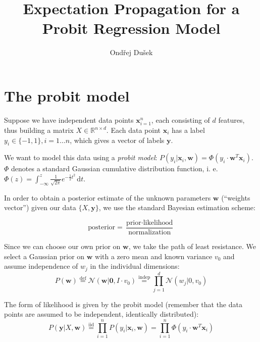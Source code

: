 \documentclass[10pt,a4paper,notitlepage]{article}
\title{Expectation Propagation for a Probit Regression Model}
\author{Ondřej Dušek}
\begin{document}

\def\ve#1{\mathbf{#1}}
\def\R{\mathbb{R}}
\def\E{\mathbb{E}}
\def\d{\,\mathrm{d}}
\def\N{\mathcal{N}}
\def\eqrel#1{\stackrel{\mathrm{#1}}{=}}
\def\cavity#1#2{#1^{\setminus #2}}
\def\new{\mathrm{new}}


\maketitle


\renewcommand{\baselinestretch}{1.2}
\setlength{\parskip}{8pt plus 1pt minus 2pt}


\section{The probit model}

Suppose we have independent data points ${\ve{x}}_{i=1}^n$, each consisting of $d$ features, thus building a matrix $X\in \R^{n\times d}$. Each data point $\ve{x}_i$ has a label $y_i \in \{-1,1\}, i=1\dots n$, which gives a vector of labels $\ve{y}$.

We want to model this data using a \emph{probit model}: $P(y_i|\ve{x}_i, \ve{w}) = \Phi(y_i\cdot \ve{w}^T\ve{x}_i)$. $\Phi$ denotes a standard Gaussian cumulative distribution function, i. e. $\Phi(z) = \int_{-\infty}^{z} \frac{1}{\sqrt{2\pi}} e^{-\frac{1}{2}t^2} \d t$.

In order to obtain a posterior estimate of the unknown parameters $\ve{w}$ (``weights vector'') given our data $\{X, \ve{y}\}$, we use the standard Bayesian estimation scheme:

\begin{equation}
\mbox{posterior} = \frac{\mbox{prior}\cdot\mbox{likelihood}}{\mbox{normalization}}
\end{equation}

Since we can choose our own prior on $\ve{w}$, we take the path of least resistance. We select a Gaussian prior on $\ve{w}$ with a zero mean and known variance $v_0$ and assume independence of $w_j$ in the individual dimensions:
\begin{equation}
P(\ve{w}) \eqrel{def} \N(\ve{w}|\ve{0}, I\cdot v_0) \eqrel{indep} \prod_{j=1}^d \N(w_j|0,v_0)
\end{equation}

The form of likelihood is given by the probit model (remember that the data points are assumed to be independent, identically distributed):
\begin{equation}
P(\ve{y}|X, \ve{w}) \eqrel{iid} \prod_{i=1}^n P(y_i|\ve{x}_i, \ve{w}) = \prod_{i=1}^n \Phi(y_i\cdot \ve{w}^T\ve{x}_i)
\end{equation}
\end{document}
